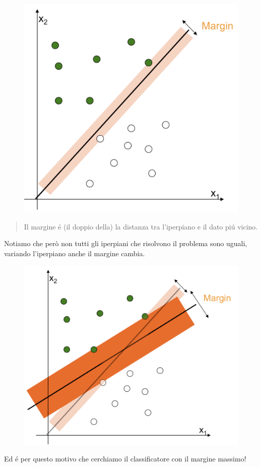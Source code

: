 \documentclass{article}
\begin{document}
\begin{figure}[H]
\centering
\includegraphics[scale=0.4]{Images/svmmargin.png}
\end{figure}
\begin{quote}
    Il margine é (il doppio della) la distanza tra l'iperpiano e il dato piú vicino.
\end{quote}
Notiamo che però non tutti gli iperpiani che risolvono il problema sono uguali, variando l'iperpiano anche il margine cambia.
\begin{figure}[H]
\centering
\includegraphics[scale=0.4]{Images/svmbigmargin.png}
\end{figure}
Ed é per questo motivo che cerchiamo il classificatore con il margine massimo!
\end{document}
